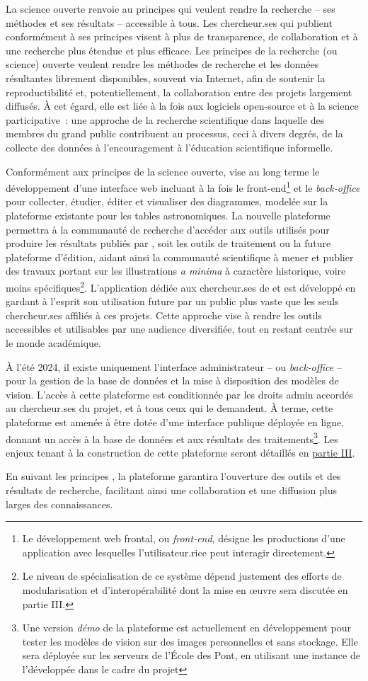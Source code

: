 La science ouverte renvoie au principes qui veulent rendre la recherche
-- ses méthodes et ses résultats -- accessible à tous. Les chercheur.ses
qui publient conformément à ses principes visent à plus de transparence,
de collaboration et à une recherche plus étendue et plus efficace. Les
principes de la recherche (ou science) ouverte veulent rendre les
méthodes de recherche et les données résultantes librement disponibles,
souvent via Internet, afin de soutenir la reproductibilité et,
potentiellement, la collaboration entre des projets largement diffusés.
À cet égard, elle est liée à la fois aux logiciels open-source et à la
science participative~: une approche de la recherche scientifique dans
laquelle des membres du grand public contribuent au processus, ceci à
divers degrés, de la collecte des données à l'encouragement à
l'éducation scientifique informelle.

Conformément aux principes de la science ouverte, \eida vise au long
terme le développement d'une interface web incluant à la fois le
front-end\footnote{Le développement web frontal, ou \textit{front-end}, désigne
  les productions d'une application avec lesquelles l'utilisateur.rice peut
  interagir directement.} et le \textit{back-office} pour collecter, étudier,
éditer et visualiser des diagrammes, modelée sur la plateforme \dishas
existante pour les tables astronomiques. La nouvelle plateforme
permettra à la communauté de recherche d'accéder aux outils utilisés
pour produire les résultats publiés par \eida, soit les outils de
traitement ou la future plateforme d'édition, aidant ainsi la communauté
scientifique à mener et publier des travaux portant sur les
illustrations \emph{a minima} à caractère historique, voire moins
spécifiques\footnote{Le niveau de spécialisation de ce système dépend
  justement des efforts de modularisation et d'interopérabilité dont la
  mise en œuvre sera discutée en partie III.}. L'application dédiée aux chercheur.ses de \eida et \vhs est développé en gardant à l'esprit son utilisation future par
un public plus vaste que les seuls chercheur.ses affiliés à ces projets.
Cette approche vise à rendre les outils accessibles et utilisables par
une audience diversifiée, tout en restant centrée sur le monde
académique.

À l'été 2024, il existe uniquement l'interface administrateur -- ou
\textit{back-office} -- pour la gestion de la base de données et la mise à
disposition des modèles de vision. L'accès à cette plateforme est
conditionnée par les droits admin accordés au chercheur.ses du projet, et à
tous ceux qui le demandent. À terme, cette plateforme est amenée à être
dotée d'une interface publique déployée en ligne, donnant un accès à la
base de données et aux résultats des traitements\footnote{Une version
  \emph{démo} de la plateforme est actuellement en développement pour
  tester les modèles de vision sur des images personnelles et sans
  stockage. Elle sera déployée sur les serveurs de l'École des Pont, en
  utilisant une instance de l'\api développée dans le cadre du projet
  \eida}. Les enjeux tenant à la construction de cette plateforme seront
détaillés en \hyperlink{partie-III}{partie III}.

En suivant les principes \fair, la plateforme garantira l'ouverture des
outils et des résultats de recherche, facilitant ainsi une collaboration
et une diffusion plus larges des connaissances.